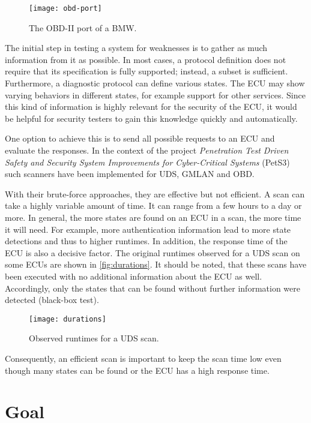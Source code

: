 \begin{figure}[htb]
    \centering
    \texttt{[image: obd-port]}
    \caption{The OBD-II port of a BMW.}
    \label{fig:obd-port}
\end{figure}

The initial step in testing a system for weaknesses is to gather as much information from it as possible. In most cases, a protocol definition does not require that its specification is fully supported; instead, a subset is sufficient.
Furthermore, a diagnostic protocol can define various states. 
The ECU may show varying behaviors in different states, for example support for other services. Since this kind of information is highly relevant for the security of the ECU, it would be helpful for security testers to gain this knowledge quickly and automatically.

One option to achieve this is to send all possible requests to an ECU and evaluate the responses. In the context of the project \emph{Penetration Test Driven Safety and Security System Improvements for Cyber-Critical Systems} (PetS3) \cite{pets3} such scanners have been implemented for UDS, GMLAN and OBD.

With their brute-force approaches, they are effective but not efficient. A scan can take a highly variable amount of time. 
It can range from a few hours to a day or more. In general, the more states are found on an ECU in a scan, the more time it will need. For example, more authentication information lead to more state detections and thus to higher runtimes. In addition, the response time of the ECU is also a decisive factor. 
The original runtimes observed for a UDS scan on some ECUs are shown in \autoref{fig:durations}. It should be noted, that these scans have been executed with no additional information about the ECU as well. 
Accordingly, only the states that can be found without further information were detected (black-box test).

\begin{figure}[htb]
    \centering
    \texttt{[image: durations]}
    \caption{Observed runtimes for a UDS scan.}
    \label{fig:durations}
\end{figure}

Consequently, an efficient scan is important to keep the scan time low even though many states can be found or the ECU has a high response time.

\section{Goal}

